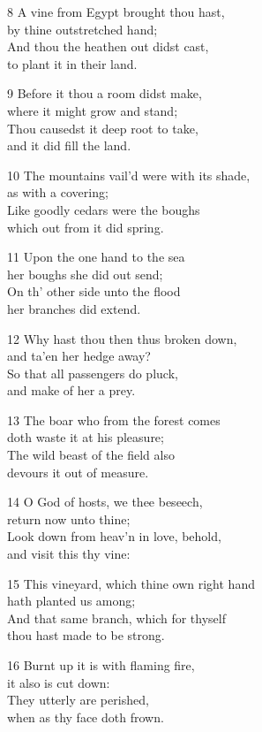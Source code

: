 8 A vine from Egypt brought thou hast,\\
by thine outstretched hand;\\
And thou the heathen out didst cast,\\
to plant it in their land.

9 Before it thou a room didst make,\\
where it might grow and stand;\\
Thou causedst it deep root to take,\\
and it did fill the land.

10 The mountains vail’d were with its shade,\\
as with a covering;\\
Like goodly cedars were the boughs\\
which out from it did spring.

11 Upon the one hand to the sea\\
her boughs she did out send;\\
On th’ other side unto the flood\\
her branches did extend.

12 Why hast thou then thus broken down,\\
and ta’en her hedge away?\\
So that all passengers do pluck,\\
and make of her a prey.

13 The boar who from the forest comes\\
doth waste it at his pleasure;\\
The wild beast of the field also\\
devours it out of measure.

14 O God of hosts, we thee beseech,\\
return now unto thine;\\
Look down from heav’n in love, behold,\\
and visit this thy vine:

15 This vineyard, which thine own right hand\\
hath planted us among;\\
And that same branch, which for thyself\\
thou hast made to be strong.

16 Burnt up it is with flaming fire,\\
it also is cut down:\\
They utterly are perished,\\
when as thy face doth frown.

